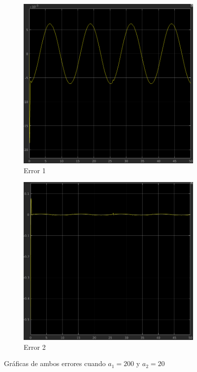 \documentclass[12pt, letterpaper]{article}
\begin{document}
\begin{figure}[H]
	\centering
	\begin{subfigure}[b]{0.49\linewidth}
		\includegraphics[width=\linewidth]{e1a200.png}
		\caption{Error 1}
	\end{subfigure}
	\begin{subfigure}[b]{0.49\linewidth}
		\includegraphics[width=\linewidth]{e2a200.png}
		\caption{Error 2}
	\end{subfigure}
	\caption{Gráficas de ambos errores cuando $a_1 = 200$ y $a_2 = 20$}
\end{figure}
\end{document}
